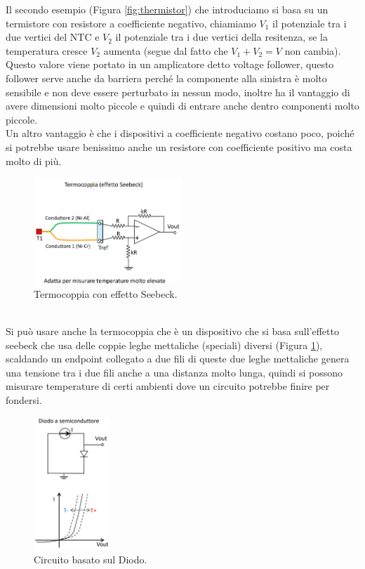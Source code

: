 \documentclass[11pt, twocolumn]{article}
\begin{document}
Il secondo esempio (Figura \ref{fig:thermistor}) che introduciamo si basa su un termistore con resistore a coefficiente negativo, chiamiamo $V_1$ il potenziale tra i due vertici del NTC e $V_2$ il potenziale tra i due vertici della resitenza, se la temperatura cresce $V_2$ aumenta (segue dal fatto che $V_1+V_2 = V$ non cambia).
Questo valore viene portato in un amplicatore detto voltage follower, questo follower serve anche da barriera perché la componente alla sinistra è molto sensibile e non deve essere perturbato in nessun modo, inoltre ha il vantaggio di avere dimensioni molto piccole e quindi di entrare anche dentro componenti molto piccole.\\
Un altro vantaggio è che i dispositivi a coefficiente negativo costano poco, poiché si potrebbe usare benissimo anche un resistore con coefficiente positivo ma costa molto di più.
\begin{figure}[!h]
  \centering
  \includegraphics[width=\linewidth,height=4cm]{imgs/termocoppia.png}
  \caption{Termocoppia con effetto Seebeck.}
  \label{fig:termocoppia}
\end{figure}\\
Si può usare anche la termocoppia che è un dispositivo che si basa sull'effetto seebeck che usa delle coppie leghe mettaliche (speciali) diversi (Figura \ref{fig:termocoppia}), scaldando un endpoint collegato a due fili di queste due leghe mettaliche genera una tensione tra i due fili anche a una distanza molto lunga, quindi si possono misurare temperature di certi ambienti dove un circuito potrebbe finire per fondersi.
\begin{figure}[!h]
  \centering
  \includegraphics[width=\linewidth,height=5cm]{imgs/diodo.png}
  \caption{Circuito basato sul Diodo.}
  \label{fig:diodo}
\end{figure}\\
\end{document}
